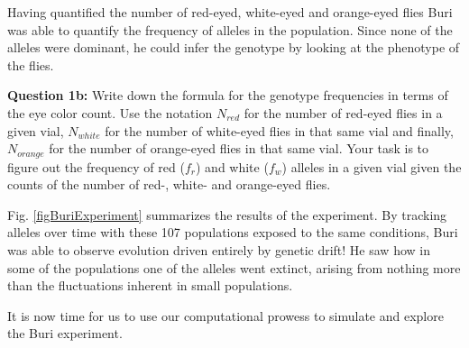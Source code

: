 \documentclass[12pt]{article}    %
\begin{document}
\begin{figure}[h!]
\end{figure}

Having quantified the number of red-eyed, white-eyed and orange-eyed flies Buri
was able to quantify the frequency of alleles in the population. Since none of
the alleles were dominant, he could infer the genotype  by
looking at the phenotype of the flies.

\vspace{5mm}
\textbf{Question 1b:} Write down the formula for the genotype frequencies in
terms of the eye color count.  Use the notation $N_{red}$ for the number of
red-eyed flies in a given vial, $N_{white}$ for the number of white-eyed flies
in that same vial and finally, $N_{orange}$ for the number of orange-eyed flies
in that same vial.  Your task is to figure out the frequency of red ($f_r$) and
white ($f_w$) alleles in a given vial given the counts of the number of red-,
white- and orange-eyed flies.
\vspace{5mm}


Fig. \ref{figBuriExperiment} summarizes the
results of the experiment. By tracking alleles over time with these 107
populations exposed to the same conditions, Buri was able to observe evolution
driven entirely by genetic drift! He saw how in some of the populations one of
the alleles went extinct, arising from nothing more than the fluctuations inherent in small
populations.

\begin{figure}[h!]
\end{figure}

It is now time for us to use our computational prowess to simulate and explore
the Buri experiment.
\end{document}
